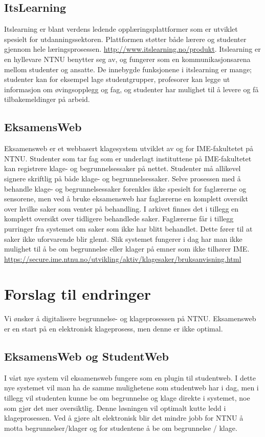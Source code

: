 \documentclass[12pt]{article}
\begin{document}
\subsection{ItsLearning}

Itslearning er blant verdens ledende opplæringsplattformer som er utviklet spesielt for utdanningssektoren. Plattformen støtter både lærere og studenter gjennom hele læringsprosessen. \url{http://www.itslearning.no/produkt}. Itslearning er en hyllevare NTNU benytter seg av, og fungerer som en kommunikasjonsarena mellom studenter og ansatte. De innebygde funksjonene i itslearning er mange; studenter kan for eksempel  lage studentgrupper, profesorer kan legge ut informasjon om øvingsopplegg og fag, og studenter har mulighet til å levere og få tilbakemeldinger på arbeid.

\subsection{EksamensWeb}
Eksamensweb er et webbasert klagesystem utviklet av og for IME-fakultetet på NTNU. Studenter som tar fag som er underlagt instituttene på IME-fakultetet kan registrere klage- og begrunnelsessaker på nettet. Studenter må allikevel signere skriftlig på både klage- og begrunnelsessaker. Selve prosessen med å behandle klage- og begrunnelsessaker forenkles ikke spesielt for faglærerne og sensorene, men ved å bruke eksamensweb har faglærerne en komplett oversikt over hvilke saker som venter på behandling. I arkivet finnes det i tillegg en komplett oversikt over tidligere behandlede saker. Faglærerne får i tillegg purringer fra systemet om saker som ikke har blitt behandlet. Dette fører til at saker ikke uforvarende blir glemt. Slik systemet fungerer i dag har man ikke mulighet til å be om begrunnelse eller klager på emner som ikke tilhører IME.
\url{https://secure.ime.ntnu.no/utvikling/aktiv/klagesaker/bruksanvisning.html}


\section{Forslag til endringer}
Vi ønsker å digitalisere begrunnelse- og klageprosessen på NTNU. Eksamensweb er en start på en elektronisk klageprosess, men denne er ikke optimal.

\subsection*{EksamensWeb og StudentWeb}
I vårt nye system vil eksamensweb fungere som en plugin til studentweb. I dette nye systemet vil man ha de samme mulighetene som studentweb har i dag, men i tillegg vil studenten kunne be om begrunnelse og klage direkte i systemet, noe som gjør det mer oversiktlig. Denne løsningen vil optimalt kutte ledd i klageprosessen. Ved å gjøre alt elektronisk blir det mindre jobb for NTNU å motta begrunnelser/klager og for studentene å be om begrunnelse / klage.
\end{document}

